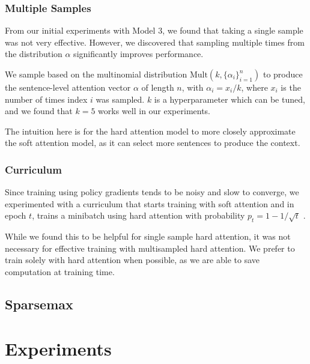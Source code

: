 \documentclass[11pt]{report}
\begin{document}



\subsection{Multiple Samples}

From our initial experiments with Model 3, we found that taking a single sample was not very effective. However, we discovered that sampling multiple times from the distribution $\alpha$ significantly improves performance.

We sample based on the multinomial distribution $\mathrm{Mult}(k, \{\alpha_i\}_{i=1}^n)$ to produce the sentence-level attention vector $\alpha$ of length $n$, with $\alpha_i = x_i / k$, where $x_i$ is the number of times index $i$ was sampled. $k$ is a hyperparameter which can be tuned, and we found that $k=5$ works well in our experiments.

The intuition here is for the hard attention model to more closely approximate the soft attention model, as it can select more sentences to produce the context.

\subsection{Curriculum}

Since training using policy gradients tends to be noisy and slow to converge, we experimented with a curriculum that starts training with soft attention and in epoch $t$, trains a minibatch using hard attention with probability $p_t = 1 - 1/\sqrt{t}$ \citep{bengio2016hardntm}.

While we found this to be helpful for single sample hard attention, it was not necessary for effective training with multisampled hard attention. We prefer to train solely with hard attention when possible, as we are able to save computation at training time.

\section{Sparsemax}



\chapter{Experiments}
\end{document}
